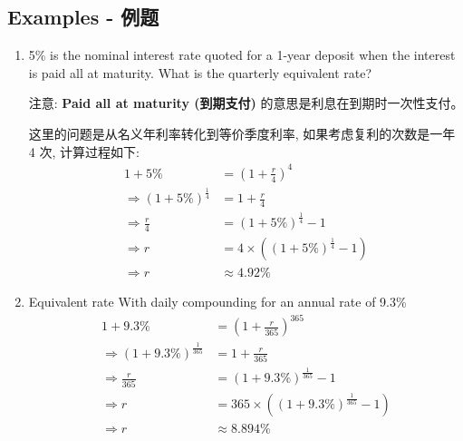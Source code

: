 \subsection{Examples - 例题}
\begin{enumerate}
    \item 5\% is the nominal interest rate quoted for a 1-year deposit when the
          interest is paid all at maturity. What is the quarterly equivalent rate?

          注意: \textbf{Paid all at maturity (到期支付)} 的意思是利息在到期时一次性支付。

          这里的问题是从名义年利率转化到等价季度利率, 如果考虑复利的次数是一年 4 次, 计算过程如下:
          \begin{equation}
              \begin{aligned}
                  1 + 5\%                                        & = \left(1 + \frac{r}{4}\right)^4                               \\
                  \Rightarrow \left(1 + 5\%\right)^{\frac{1}{4}} & = 1 + \frac{r}{4}                                              \\
                  \Rightarrow \frac{r}{4}                        & = \left(1 + 5\%\right)^{\frac{1}{4}} - 1                       \\
                  \Rightarrow r                                  & = 4 \times \left(\left(1 + 5\%\right)^{\frac{1}{4}} - 1\right) \\
                  \Rightarrow r                                  & \approx 4.92\%
              \end{aligned}
          \end{equation}

    \item Equivalent rate With daily compounding for an annual rate of 9.3\%
          \begin{equation}
              \begin{aligned}
                  1 + 9.3\%                                          & = \left(1 + \frac{r}{365}\right)^{365}                               \\
                  \Rightarrow \left(1 + 9.3\%\right)^{\frac{1}{365}} & = 1 + \frac{r}{365}                                                  \\
                  \Rightarrow \frac{r}{365}                          & = \left(1 + 9.3\%\right)^{\frac{1}{365}} - 1                         \\
                  \Rightarrow r                                      & = 365 \times \left(\left(1 + 9.3\%\right)^{\frac{1}{365}} - 1\right) \\
                  \Rightarrow r                                      & \approx 8.894\%
              \end{aligned}
          \end{equation}


\end{enumerate}
